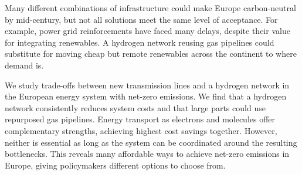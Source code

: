 
Many different combinations of infrastructure could make Europe carbon-neutral
by mid-century, but not all solutions meet the same level of acceptance. For
example, power grid reinforcements have faced many delays, despite their value
for integrating renewables. A hydrogen network reusing gas pipelines could
substitute for moving cheap but remote renewables across the continent to where
demand is.

We study trade-offs between new transmission lines and a hydrogen network in the
European energy system with net-zero \co emissions. We find that a hydrogen
network consistently reduces system costs and that large parts could use
repurposed gas pipelines. Energy transport as electrons and molecules offer
complementary strengths, achieving highest cost savings together. However,
neither is essential as long as the system can be coordinated around the
resulting bottlenecks. This reveals many affordable ways to achieve net-zero
emissions in Europe, giving policymakers different options to choose from.
